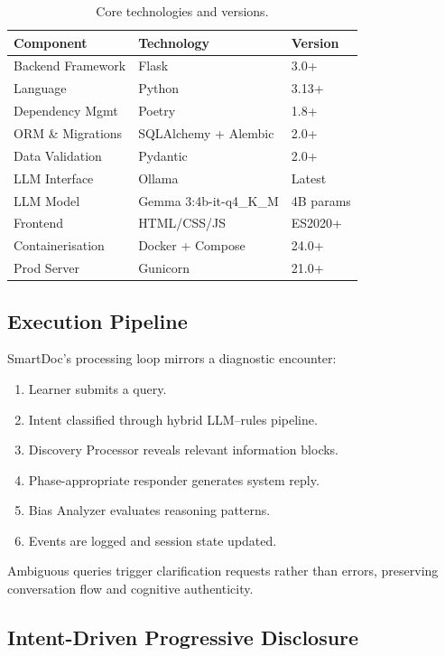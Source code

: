 \begin{table}[h]
\centering
\caption{Core technologies and versions.}
\label{tab:core_stack}
\setlength{\tabcolsep}{6pt}
\renewcommand{\arraystretch}{1.12}
\begin{tabular}{p{3.2cm} p{4.0cm} p{2.0cm}}
\toprule
\textbf{Component} & \textbf{Technology} & \textbf{Version} \\
\midrule
Backend Framework & Flask & 3.0+ \\
Language & Python & 3.13+ \\
Dependency Mgmt & Poetry & 1.8+ \\
ORM \& Migrations & SQLAlchemy + Alembic & 2.0+ \\
Data Validation & Pydantic & 2.0+ \\
LLM Interface & Ollama & Latest \\
LLM Model & Gemma 3:4b-it-q4\_K\_M & 4B params \\
Frontend & HTML/CSS/JS & ES2020+ \\
Containerisation & Docker + Compose & 24.0+ \\
Prod Server & Gunicorn & 21.0+ \\
\bottomrule
\end{tabular}
\end{table}

\subsection{Execution Pipeline}

SmartDoc's processing loop mirrors a diagnostic encounter:

\begin{enumerate}
  \item Learner submits a query.
  \item Intent classified through hybrid LLM–rules pipeline.
  \item Discovery Processor reveals relevant information blocks.
  \item Phase-appropriate responder generates system reply.
  \item Bias Analyzer evaluates reasoning patterns.
  \item Events are logged and session state updated.
\end{enumerate}

Ambiguous queries trigger clarification requests rather than errors, preserving
conversation flow and cognitive authenticity.

\subsection{Intent-Driven Progressive Disclosure}
\label{sec:algo_progressive}

